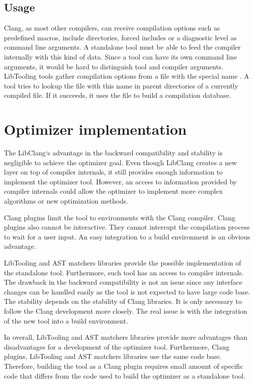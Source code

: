 \subsection{Usage}
Clang, as most other compilers, can receive compilation options such as predefined macros, include directories, forced includes or a diagnostic level as command line arguments. A standalone tool must be able to feed the compiler internally with this kind of data. Since a tool can have its own command line arguments, it would be hard to distinguish tool and compiler arguments. LibTooling tools gather compilation options from a file with the special name . A tool tries to lookup the file with this name in parent directories of a currently compiled file. If it succeeds, it uses the file to build a compilation database.

\section{Optimizer implementation}
\label{clang-optimizer}
The LibClang`s advantage in the backward compatibility and stability is negligible to achieve the optimizer goal. Even though LibClang creates a new layer on top of compiler internals, it still provides enough information to implement the optimizer tool. However, an access to information provided by compiler internals could allow the optimizer to implement more complex algorithms or new optimization methods.

Clang plugins limit the tool to environments with the Clang compiler. Clang plugins also cannot be interactive. They cannot interrupt the compilation process to wait for a user input. An easy integration to a build environment is an obvious advantage.

LibTooling and AST matchers libraries provide the possible implementation of the standalone tool. Furthermore, such tool has an access to compiler internals. The drawback in the backward compatibility is not an issue since any interface changes can be handled easily as the tool is not expected to have large code base. The stability depends on the stability of Clang libraries. It is only necessary to follow the Clang development more closely. The real issue is with the integration of the new tool into a build environment.

In overall, LibTooling and AST matchers libraries provide more advantages than disadvantages for a development of the optimizer tool. Furthermore, Clang plugins, LibTooling and AST matchers libraries use the same code base. Therefore, building the tool as a Clang plugin requires small amount of specific code that differs from the code used to build the optimizer as a standalone tool.